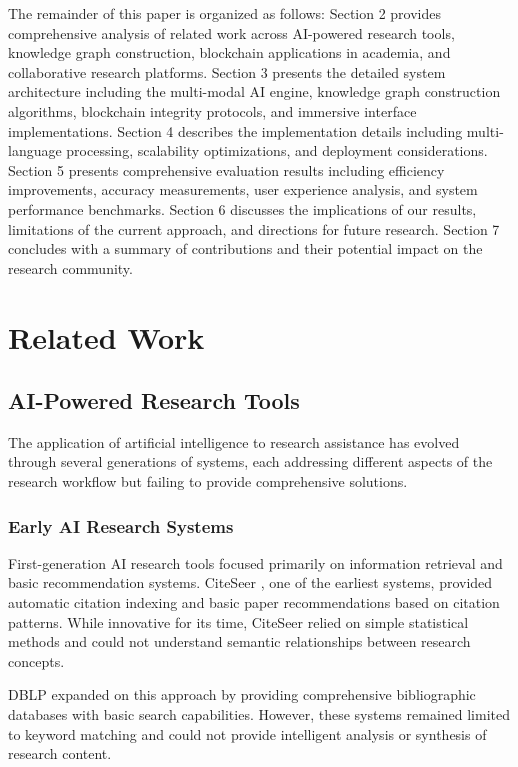 \documentclass[10pt,twocolumn]{article}
\begin{document}
The remainder of this paper is organized as follows: Section 2 provides comprehensive analysis of related work across AI-powered research tools, knowledge graph construction, blockchain applications in academia, and collaborative research platforms. Section 3 presents the detailed system architecture including the multi-modal AI engine, knowledge graph construction algorithms, blockchain integrity protocols, and immersive interface implementations. Section 4 describes the implementation details including multi-language processing, scalability optimizations, and deployment considerations. Section 5 presents comprehensive evaluation results including efficiency improvements, accuracy measurements, user experience analysis, and system performance benchmarks. Section 6 discusses the implications of our results, limitations of the current approach, and directions for future research. Section 7 concludes with a summary of contributions and their potential impact on the research community.

\section{Related Work}

\subsection{AI-Powered Research Tools}

The application of artificial intelligence to research assistance has evolved through several generations of systems, each addressing different aspects of the research workflow but failing to provide comprehensive solutions.

\subsubsection{Early AI Research Systems}

First-generation AI research tools focused primarily on information retrieval and basic recommendation systems. CiteSeer \cite{lawrence1999digital}, one of the earliest systems, provided automatic citation indexing and basic paper recommendations based on citation patterns. While innovative for its time, CiteSeer relied on simple statistical methods and could not understand semantic relationships between research concepts.

DBLP \cite{ley2002dblp} expanded on this approach by providing comprehensive bibliographic databases with basic search capabilities. However, these systems remained limited to keyword matching and could not provide intelligent analysis or synthesis of research content.
\end{document}
